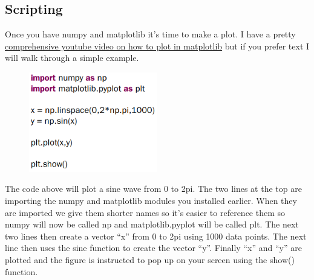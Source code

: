 \subsection{Scripting}

Once you have numpy and matplotlib it’s time to make a plot. I have a
pretty \href{https://www.youtube.com/watch?v=7nAzHPURYW0&list=PL_D7_GvGz-v1RsDs_OdNW65qRjEjmpfQx&index=8}{comprehensive youtube video on how to plot in matplotlib} but if
you prefer text I will walk through a simple example.

\begin{figure}[H]
  \begin{center}
    \includegraphics[width=0.5\textwidth]{Figures/matplotlib_example.png}
  \end{center}
\end{figure}

The code above will plot a sine wave from 0 to 2pi. The two lines at
the top are importing the numpy and matplotlib modules you installed
earlier. When they are imported we give them shorter names so it’s
easier to reference them so numpy will now be called np and
matplotlib.pyplot will be called plt. The next two lines then create a
vector “x” from 0 to 2pi using 1000 data points. The next line then
uses the sine function to create the vector “y”. Finally “x” and “y”
are plotted and the figure is instructed to pop up on your screen
using the show() function.





